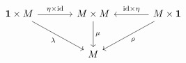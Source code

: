 \documentclass[border=6pt]{standalone}
\newcommand{\id}{\mathrm{id}}
\begin{document}
$
\begin{tikzcd}[column sep=large, row sep=large]
  \mathbf{1} \times M \arrow[r, "\eta \times \id"] \arrow[dr, "\lambda"'] & M \times M \arrow[d, "\mu"] & M \times \mathbf{1} \arrow[l, "\id \times \eta"'] \arrow[dl, "\rho"] \\
  & M &
\end{tikzcd}
$
\end{document}
